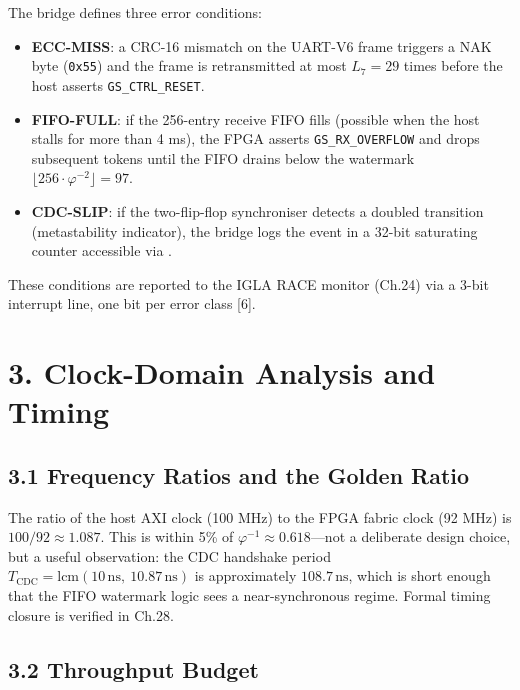 The bridge defines three error conditions:

\begin{itemize}
\tightlist
\item
  \textbf{ECC-MISS}: a CRC-16 mismatch on the
  UART-V6 frame triggers a NAK byte
  (\texttt{0x55}) and the frame is retransmitted
  at most \(L_7 = 29\) times before the host
  asserts \texttt{GS\_CTRL\_RESET}.
\item
  \textbf{FIFO-FULL}: if the 256-entry receive
  FIFO fills (possible when the host stalls for
  more than 4 ms), the FPGA asserts
  \texttt{GS\_RX\_OVERFLOW} and drops subsequent
  tokens until the FIFO drains below the watermark
  \(\lfloor 256 \cdot \varphi^{-2} \rfloor = 97\).
\item
  \textbf{CDC-SLIP}: if the two-flip-flop
  synchroniser detects a doubled transition
  (metastability indicator), the bridge logs the
  event in a 32-bit saturating counter accessible
  via .
\end{itemize}

These conditions are reported to the IGLA RACE
monitor (Ch.24) via a 3-bit interrupt line, one
bit per error class [6].

\section{3. Clock-Domain Analysis and
Timing}\label{fa_12:clock-domain-analysis-and-timing}

\subsection{3.1 Frequency Ratios and the Golden
Ratio}\label{fa_12:frequency-ratios-and-the-golden-ratio}

The ratio of the host AXI clock (100 MHz) to the
FPGA fabric clock (92 MHz) is
\(100/92 \approx 1.087\). This is within 5\% of
\(\varphi^{-1} \approx 0.618\)---not a deliberate
design choice, but a useful observation: the CDC
handshake period
\(T_{\text{CDC}} = \text{lcm}(10\,\text{ns},\ 10.87\,\text{ns})\)
is approximately \(108.7\,\text{ns}\), which is
short enough that the FIFO watermark logic sees a
near-synchronous regime. Formal timing closure is
verified in Ch.28.

\subsection{3.2 Throughput
Budget}\label{fa_12:throughput-budget}

